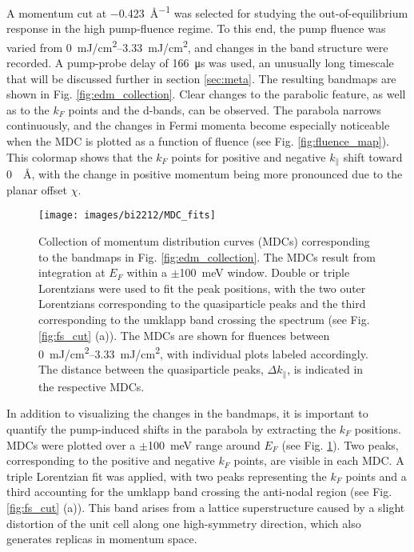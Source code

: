 A momentum cut at \qty{-0.423}{\angstrom^{-1}} was selected for studying the out-of-equilibrium response in the high pump-fluence regime.
To this end, the pump fluence was varied from \qtyrange{0}{3.33}{\milli\joule/\centi\meter\squared}, and changes in the band structure were recorded.
A pump-probe delay of \qty{166}{\micro\second} was used, an unusually long timescale that will be discussed further in section \ref{sec:meta}.
The resulting bandmaps are shown in Fig. \ref{fig:edm_collection}.
Clear changes to the parabolic feature, as well as to the $k_F$ points and the  d-bands, can be observed.
The parabola narrows continuously, and the changes in Fermi momenta become especially noticeable when the MDC is plotted as a function of fluence (see Fig. \ref{fig:fluence_map}).
This colormap shows that the $k_F$ points for positive and negative $k_\parallel$ shift toward \qty{0}{\per\angstrom}, with the change in positive momentum being more pronounced due to the planar offset $\chi$.

\begin{figure}[t]
	\centering
	\texttt{[image: images/bi2212/MDC\_fits]}
	\caption{Collection of momentum distribution curves (MDCs) corresponding to the bandmaps in Fig. \ref{fig:edm_collection}. The MDCs result from integration at $E_F$ within a $\pm$\qty{100}{\milli\electronvolt} window. Double or triple Lorentzians were used to fit the peak positions, with the two outer Lorentzians corresponding to the quasiparticle peaks and the third corresponding to the umklapp band crossing the spectrum (see Fig. \ref{fig:fs_cut} (a)). The MDCs are shown for fluences between \qtyrange{0}{3.33}{\milli\joule/\centi\meter\squared}, with individual plots labeled accordingly. The distance between the quasiparticle peaks, $\Delta k_\parallel$, is indicated in the respective MDCs.}
	\label{fig:mdc_fits}
\end{figure}

In addition to visualizing the changes in the bandmaps, it is important to quantify the pump-induced shifts in the parabola by extracting the $k_F$ positions.
MDCs were plotted over a $\pm$\qty{100}{\milli\electronvolt} range around $E_F$ (see Fig. \ref{fig:mdc_fits}).
Two peaks, corresponding to the positive and negative $k_F$ points, are visible in each MDC.
A triple Lorentzian fit was applied, with two peaks representing the $k_F$ points and a third accounting for the umklapp band crossing the anti-nodal region (see Fig. \ref{fig:fs_cut} (a)).
This band arises from a lattice superstructure caused by a slight distortion of the unit cell along one high-symmetry direction, which also generates replicas in momentum space.

